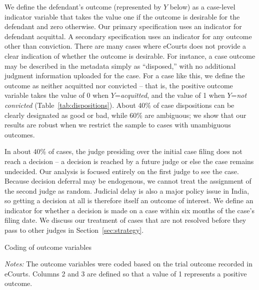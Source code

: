 \documentclass[12pt,english]{article}
\begin{document}
We define the defendant's outcome (represented by $Y$ below) as a case-level indicator variable that takes the value one if the outcome is desirable for the defendant and zero otherwise. Our primary specification uses an indicator for defendant acquittal. A secondary specification uses an indicator for any outcome other than conviction. There are many cases where eCourts does not provide a clear indication of whether the outcome is desirable. For instance, a case outcome may be described in the metadata simply as ``disposed,'' with no additional judgment information uploaded for the case. For a case like this, we define the outcome as neither acquitted nor convicted -- that is, the positive outcome variable takes the value of 0 when $Y$=\textit{acquitted}, and the value of 1 when $Y$=\textit{not convicted} (Table~\ref{tab:dispositions}). About 40\% of case dispositions can be clearly designated as good or bad, while 60\% are ambiguous; we show that our results are robust when we restrict the sample to cases with unambiguous outcomes.

In about 40\% of cases, the judge presiding over the initial case filing does not reach a decision -- a decision is reached by a future judge or else the case remains undecided. Our analysis is focused entirely on the first judge to see the case. Because decision deferral may be endogenous, we cannot treat the assignment of the second judge as random. Judicial delay is also a major policy issue in India, so getting a decision at all is therefore itself an outcome of interest. We define an indicator for whether a decision is made on a case within six months of the case's filing date. We discuss our treatment of cases that are not resolved before they pass to other judges in Section~\ref{sec:strategy}. 

\begin{table}[ht]
\begin{center}
  \caption{Coding of outcome variables}
  \label{tab:outcome_variable_coding}
  
 
\begin{minipage}{0.95\textwidth}
    {\vspace{1mm}\footnotesize \emph{Notes:} The outcome variables were coded based on the trial outcome recorded in eCourts. Columns 2 and 3 are defined so that a value of 1 represents a positive outcome.  \vspace{1mm}  \par}
   \end{minipage}
   
\end{center}
\end{table}
\end{document}
